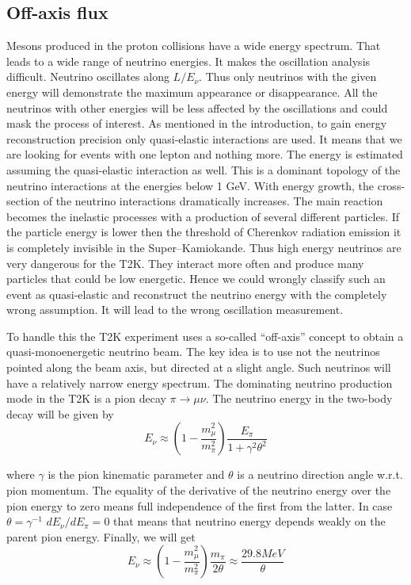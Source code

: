 \documentclass[../main.tex]{subfiles}
\begin{document}
\subsection{Off-axis flux}
\label{sec:T2K:oa_flux}
Mesons produced in the proton collisions have a wide energy spectrum. That leads to a wide range of neutrino energies. It makes the oscillation analysis difficult. Neutrino oscillates along $L/E_\nu$. Thus only neutrinos with the given energy will demonstrate the maximum appearance or disappearance. All the neutrinos with other energies will be less affected by the oscillations and could mask the process of interest. As mentioned in the introduction, to gain energy reconstruction precision only quasi-elastic interactions are used. It means that we are looking for events with one lepton and nothing more. The energy is estimated assuming the quasi-elastic interaction as well. This is a dominant topology of the neutrino interactions at the energies below 1 GeV. With energy growth, the cross-section of the neutrino interactions dramatically increases. The main reaction becomes the inelastic processes with a production of several different particles. If the particle energy is lower then the threshold of Cherenkov radiation emission it is completely invisible in the Super--Kamiokande. Thus high energy neutrinos are very dangerous for the T2K. They interact more often and produce many particles that could be low energetic. Hence we could wrongly classify such an event as quasi-elastic and reconstruct the neutrino energy with the completely wrong assumption. It will lead to the wrong oscillation measurement.

To handle this the T2K experiment uses a so-called ``off-axis'' concept to obtain a quasi-monoenergetic neutrino beam. The key idea is to use not the neutrinos pointed along the beam axis, but directed at a slight angle. Such neutrinos will have a relatively narrow energy spectrum. The dominating neutrino production mode in the T2K is a pion decay $\pi\to\mu\nu$. The neutrino energy in the two-body decay will be given by
\begin{equation}
E_\nu\approx\left(1-\frac{m_\mu^2}{m_\pi^2}\right)\frac{E_\pi}{1+\gamma^2\theta^2}
\end{equation}

where $\gamma$ is the pion kinematic parameter and $\theta$ is a neutrino direction angle w.r.t. pion momentum. The equality of the derivative of the neutrino energy over the pion energy to zero means full independence of the first from the latter. In case $\theta=\gamma^{-1}$ $dE_\nu/dE_\pi=0$ that means that neutrino energy depends weakly on the parent pion energy. Finally, we will get
\begin{equation}
E_\nu\approx\left(1-\frac{m_\mu^2}{m_\pi^2}\right)\frac{m_\pi}{2\theta}\approx\frac{29.8MeV}{\theta}
\end{equation}
\end{document}
